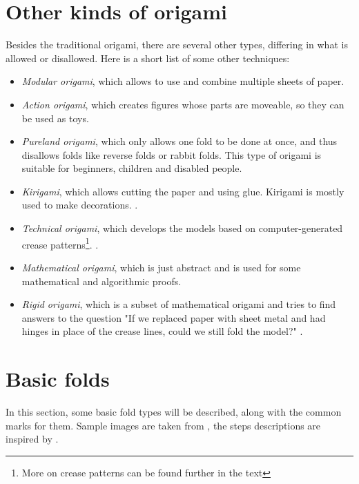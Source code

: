 \section{Other kinds of origami}
Besides the traditional origami, there are several other types, differing in what is allowed or disallowed. Here is a short list of some other techniques:
\begin{itemize}
\item \emph{Modular origami}, which allows to use and combine multiple sheets of paper. \cite{fuse}
\item \emph{Action origami}, which creates figures whose parts are moveable, so they can be used as toys. \cite{lang2}
\item \emph{Pureland origami}, which only allows one fold to be done at once, and thus disallows folds like reverse folds or rabbit folds. This type of origami is suitable for beginners, children and disabled people. \cite{smith}
\item \emph{Kirigami}, which allows cutting the paper and using glue. Kirigami is mostly used to make decorations. \cite{temko2}.
\item \emph{Technical origami}, which develops the models based on computer-generated crease patterns\footnote{More on crease patterns can be found further in the text}. \cite{mobilereference}. %
\item \emph{Mathematical origami}, which is just abstract and is used for some mathematical and algorithmic proofs.
\item \emph{Rigid origami}, which is a subset of mathematical origami and tries to find answers to the question "If we replaced paper with sheet metal and had hinges in place of the crease lines, could we still fold the model?" \cite{mobilereference}.
\end{itemize}

\section{Basic folds}
In this section, some basic fold types will be described, along with the common marks for them. Sample images are taken from \cite{folds}, the steps descriptions are inspired by \cite{lang}.

